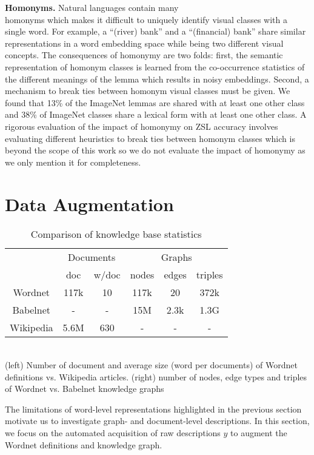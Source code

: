 \textbf{Homonyms.} Natural languages contain many\\ homonyms which makes it difficult to uniquely identify visual classes with a single word. For example, a ``(river) bank'' and a ``(financial) bank'' share similar representations in a word embedding space while being two different visual concepts. The consequences of homonymy are two folds: first, the semantic representation of homonym classes is learned from the co-occurrence statistics of the different meanings of the lemma which results in noisy embeddings. Second, a mechanism to break ties between homonym visual classes must be given. We found that 13\% of the ImageNet lemmas are shared with at least one other class and 38\% of ImageNet classes share a lexical form with at least one other class. A rigorous evaluation of the impact of homonymy on ZSL accuracy involves evaluating different heuristics to break ties between homonym classes which is beyond the scope of this work so we do not evaluate the impact of homonymy as we only mention it for completeness.

\section{Data Augmentation}
\begin{table}[t]
\centering
\caption{Comparison of knowledge base statistics}
\begin{tabular}{ c c c | c c c}	
 & \multicolumn{2}{c}{Documents} & \multicolumn{3}{c}{Graphs} \\	
 & doc & w/doc & nodes & edges & triples\\
\hline			
Wordnet   & 117k & 10 & 117k & 20 & 372k\\
Babelnet  & - & - & 15M & 2.3k & 1.3G\\
Wikipedia & 5.6M & 630 & - & - & -\\
\hline
\end{tabular}
\\(left) Number of document and average size (word per documents) of Wordnet definitions vs. Wikipedia articles. (right) number of nodes, edge types and triples of Wordnet vs. Babelnet knowledge graphs
\end{table}

The limitations of word-level representations highlighted in the previous section motivate us to investigate graph- and document-level descriptions. In this section, we focus on the automated acquisition of raw descriptions $y$ to augment the Wordnet definitions and knowledge graph.
 
